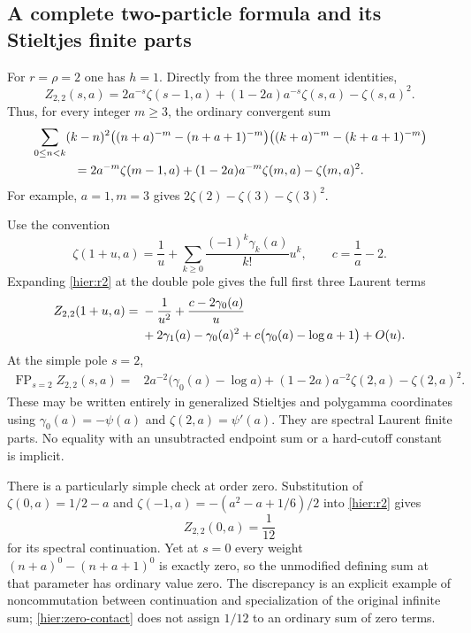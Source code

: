 \subsection{A complete two-particle formula and its Stieltjes finite parts}

For $r=\rho=2$ one has $h=1$.  Directly from the three moment
identities,
\begin{equation}\label{hier:r2}
 \boxed{\displaystyle
 Z_{2,2}(s,a)=2a^{-s}\zeta(s-1,a)
        +(1-2a)a^{-s}\zeta(s,a)-\zeta(s,a)^2.}
\end{equation}
Thus, for every integer $m\ge3$, the ordinary convergent sum
\begin{align}\label{hier:r2-sum}
 &\sum_{0\le n<k}(k-n)^2
 \bigl((n+a)^{-m}-(n+a+1)^{-m}\bigr)
 \bigl((k+a)^{-m}-(k+a+1)^{-m}\bigr)\notag\\
 &\hspace{12mm}=2a^{-m}\zeta(m-1,a)
            +(1-2a)a^{-m}\zeta(m,a)-\zeta(m,a)^2.
\end{align}
For example, $a=1,m=3$ gives
$2\zeta(2)-\zeta(3)-\zeta(3)^2$.

Use the convention
\[
 \zeta(1+u,a)=\frac1u+
    \sum_{k\ge0}\frac{(-1)^k\gamma_k(a)}{k!}u^k,
 \qquad c=\frac1a-2.
\]
Expanding \eqref{hier:r2} at the double pole gives the full first
three Laurent terms
\begin{align}\label{hier:r2-s1}
 Z_{2,2}(1+u,a)
 ={}&-\frac1{u^2}+\frac{c-2\gamma_0(a)}u\notag\\
 &+2\gamma_1(a)-\gamma_0(a)^2
       +c\bigl(\gamma_0(a)-\log a+1\bigr)+O(u).
\end{align}
At the simple pole $s=2$,
\begin{align}\label{hier:r2-s2}
 \operatorname{FP}_{s=2}Z_{2,2}(s,a)
 ={}&2a^{-2}\bigl(\gamma_0(a)-\log a\bigr)
 +(1-2a)a^{-2}\zeta(2,a)-\zeta(2,a)^2.
\end{align}
These may be written entirely in generalized Stieltjes and polygamma
coordinates using $\gamma_0(a)=-\psi(a)$ and $\zeta(2,a)=\psi'(a)$.
They are spectral Laurent finite parts.  No equality with an
unsubtracted endpoint sum or a hard-cutoff constant is implicit.

There is a particularly simple check at order zero. Substitution of
$\zeta(0,a)=1/2-a$ and
$\zeta(-1,a)=-(a^2-a+1/6)/2$ into \eqref{hier:r2} gives
\begin{equation}\label{hier:zero-contact}
                  Z_{2,2}(0,a)=\frac1{12}
\end{equation}
for its spectral continuation. Yet at $s=0$ every weight
$(n+a)^0-(n+a+1)^0$ is exactly zero, so the unmodified defining
sum at that parameter has ordinary value zero. The discrepancy is
an explicit example of noncommutation between continuation and
specialization of the original infinite sum; \eqref{hier:zero-contact}
does not assign $1/12$ to an ordinary sum of zero terms.

